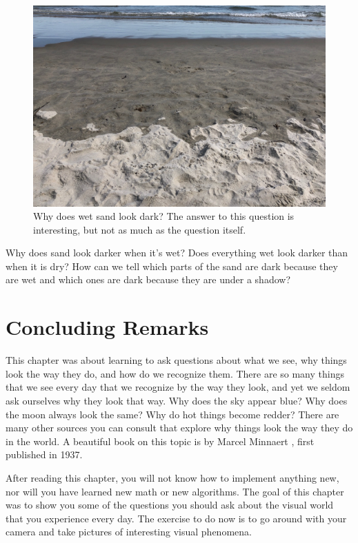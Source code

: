 \begin{figure}[t]
    \centerline{
        \includegraphics[width=.8\linewidth]{figures/visionscience/wet_sand_2.jpeg}}
    \caption{Why does wet sand look dark? The answer to this question is interesting, but not as much as the question itself.}
    \label{fig:wet_sand}
\end{figure}


Why does sand look darker when it's wet? Does everything wet look darker than when it is dry? How can we tell which parts of the sand are dark because they are wet and which ones are dark because they are under a shadow?


\section{Concluding Remarks}

This chapter was about learning to ask questions about what we see, why things look the way they do, and how do we recognize them. There are so many things that we see every day that we recognize by the way they look, and yet we seldom ask ourselves why they look that way. Why does the sky appear blue? Why does the moon always look the same? Why do hot things become redder?
There are many other sources you can consult that explore why things look the way they do in the world. A beautiful book on this topic is  by Marcel Minnaert \cite{Minnaert1993}, first published in 1937.

After reading this chapter, you will not know how to implement anything new, nor will you have learned new math or new algorithms. The goal of this chapter was to show you some of the questions you should ask about the visual world that you experience every day. The exercise to do now is to go around with your camera and take pictures of interesting visual phenomena.

